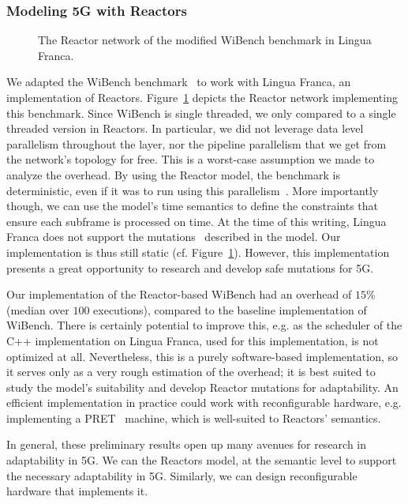 \subsubsection{Modeling 5G with Reactors}

\begin{figure}[t]
	\centering
	\resizebox{1\textwidth}{!}{}
	\caption{The Reactor network of the modified WiBench benchmark in Lingua Franca.}
	\label{fig:reactors_wibench}
\end{figure}


We adapted the WiBench benchmark~\cite{wibench} to work with Lingua Franca, an implementation of Reactors. 
Figure~\ref{fig:reactors_wibench} depicts the Reactor network implementing this benchmark. 
Since WiBench is single threaded, we only compared to a single threaded version in Reactors.
In particular, we did not leverage data level parallelism throughout the layer, nor the pipeline parallelism that we get from the network's topology for free.
This is a worst-case assumption we made to analyze the overhead.
By using the Reactor model, the benchmark is deterministic, even if it was to run using this parallelism~\cite{lohstroh_cyphy19}.
More importantly though, we can use the model's time semantics to define the constraints that ensure each subframe is processed on time.
At the time of this writing, Lingua Franca does not support the mutations~\cite{lohstroh_cyphy19} described in the model.
Our implementation is thus still static (cf. Figure~\ref{fig:reactors_wibench}).
However, this implementation presents a great opportunity to research and develop safe mutations for 5G.

Our implementation of the Reactor-based WiBench had an overhead of $15\%$ (median over $100$ executions), compared to the baseline implementation of WiBench.
There is certainly potential to improve this, e.g. as the scheduler of the C++ implementation on Lingua Franca, used for this implementation, is not optimized at all.
Nevertheless, this is a purely software-based implementation, so it serves only as a very rough estimation of the overhead; it is best suited to study the model's suitability and develop Reactor mutations for adaptability.
An efficient implementation in practice could work with reconfigurable hardware, e.g. implementing a \ac{PRET}~\cite{pret} machine, which is well-suited to Reactors' semantics.

In general, these preliminary results open up many avenues for research in adaptability in 5G. We can the Reactors model, at the semantic level to support the necessary adaptability in 5G. Similarly, we can design reconfigurable hardware that implements it.
